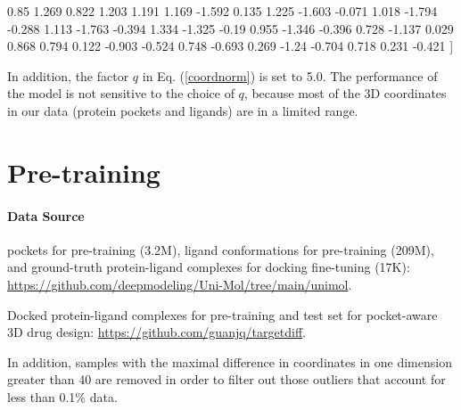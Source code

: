 {  0.85   1.269  0.822  1.203  1.191  1.169 -1.592  0.135  1.225 -1.603
 -0.071  1.018 -1.794 -0.288  1.113 -1.763 -0.394  1.334 -1.325 -0.19
  0.955 -1.346 -0.396  0.728 -1.137  0.029  0.868  0.794  0.122 -0.903
 -0.524  0.748 -0.693  0.269 -1.24  -0.704  0.718  0.231 -0.421}      ]

In addition, the factor $q$ in Eq. (\ref{coordnorm}) is set to 5.0. The performance of the model is not sensitive to the choice of $q$, because most of the 3D coordinates in our data (protein pockets and ligands) are in a limited range.

\section{Pre-training}
\label{app2}
\paragraph{Data Source}
pockets for pre-training (3.2M), ligand conformations for pre-training (209M), and ground-truth protein-ligand complexes for docking fine-tuning (17K):
\url{https://github.com/deepmodeling/Uni-Mol/tree/main/unimol}.

Docked protein-ligand complexes for pre-training and test set for pocket-aware 3D drug design:
\url{https://github.com/guanjq/targetdiff}.

In addition, samples with the maximal difference in coordinates in one dimension greater than 40 are removed in order to filter out those outliers that account for less than 0.1\% data.

